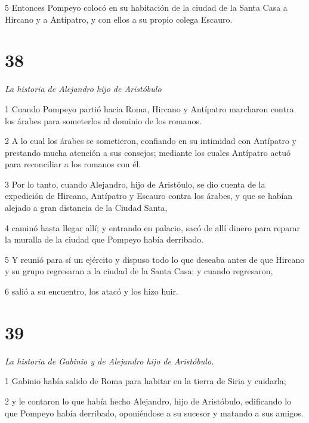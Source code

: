 \par 5 Entonces Pompeyo colocó en su habitación de la ciudad de la Santa Casa a Hircano y a Antípatro, y con ellos a su propio colega Escauro.

\chapter{38}

\par \textit{La historia de Alejandro hijo de Aristóbulo}

\par 1 Cuando Pompeyo partió hacia Roma, Hircano y Antípatro marcharon contra los árabes para someterlos al dominio de los romanos.

\par 2 A lo cual los árabes se sometieron, confiando en su intimidad con Antípatro y prestando mucha atención a sus consejos; mediante los cuales Antípatro actuó para reconciliar a los romanos con él.

\par 3 Por lo tanto, cuando Alejandro, hijo de Aristóulo, se dio cuenta de la expedición de Hircano, Antípatro y Escauro contra los árabes, y que se habían alejado a gran distancia de la Ciudad Santa,

\par 4 caminó hasta llegar allí; y entrando en palacio, sacó de allí dinero para reparar la muralla de la ciudad que Pompeyo había derribado.

\par 5 Y reunió para sí un ejército y dispuso todo lo que deseaba antes de que Hircano y su grupo regresaran a la ciudad de la Santa Casa; y cuando regresaron,

\par 6 salió a su encuentro, los atacó y los hizo huir.


\chapter{39}

\par \textit{La historia de Gabinio y de Alejandro hijo de Aristóbulo.}

\par 1 Gabinio había salido de Roma para habitar en la tierra de Siria y cuidarla;

\par 2 y le contaron lo que había hecho Alejandro, hijo de Aristóbulo, edificando lo que Pompeyo había derribado, oponiéndose a su sucesor y matando a sus amigos.

